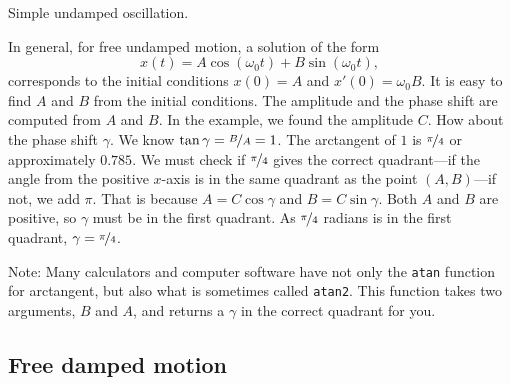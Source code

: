 \begin{mywrapfig}[15]{3.25in}
\capstart
{}
\caption{Simple undamped oscillation.\label{mv:undampedfig}}
\end{mywrapfig}

In general, for free undamped motion, a solution of the
form
\begin{equation*}
x(t) = A \cos (\omega_0 t) + B \sin (\omega_0 t) ,
\end{equation*}
corresponds to the initial conditions $x(0) = A$ and $x'(0) = \omega_0 B$.
It is easy to find $A$ and $B$ from the initial
conditions. 
The amplitude and the phase shift are computed from $A$ and $B$.
In the example, we found the amplitude $C$.
How about the phase shift $\gamma$.
We know $\tan \gamma = \nicefrac{B}{A} = 1$.
The arctangent of $1$ is $\nicefrac{\pi}{4}$ or approximately $0.785$.
We must check if $\nicefrac{\pi}{4}$ gives the correct
quadrant---if the angle from the positive $x$-axis is in the same quadrant as the
point $(A,B)$---if not, we add $\pi$.
That is because $A = C \cos \gamma$ and $B = C \sin \gamma$.
Both $A$ and $B$ are positive, so $\gamma$ must be in the first
quadrant.  As $\nicefrac{\pi}{4}$ radians is in the first quadrant,
$\gamma = \nicefrac{\pi}{4}$.

Note: Many
calculators and computer software have not only the
\texttt{atan} function
for arctangent, but also what is sometimes called \texttt{atan2}.
This function
takes two arguments, $B$ and $A$, and returns a $\gamma$ in the
correct quadrant for you.

\subsection{Free damped motion}


